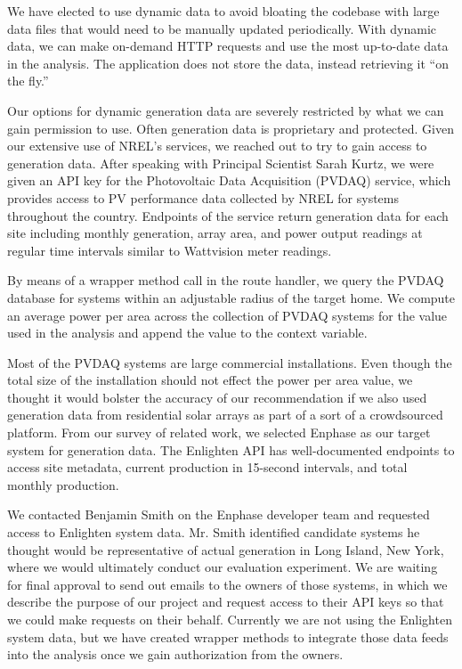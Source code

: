 \documentclass[pageno]{jpaper}
\begin{document}
We have elected to use dynamic data to avoid bloating the codebase with large data files that would need to be manually updated periodically. With dynamic data, we can make on-demand HTTP requests and use the most up-to-date data in the analysis. The application does not store the data, instead retrieving it ``on the fly.''

Our options for dynamic generation data are severely restricted by what we can gain permission to use. Often generation data is proprietary and protected. Given our extensive use of NREL's services, we reached out to try to gain access to generation data. After speaking with Principal Scientist Sarah Kurtz, we were given an API key for the Photovoltaic Data Acquisition (PVDAQ) service, which provides access to PV performance data collected by NREL for systems throughout the country. Endpoints of the service return generation data for each site including monthly generation, array area, and power output readings at regular time intervals similar to Wattvision meter readings.

By means of a wrapper method call in the route handler, we query the PVDAQ database for systems within an adjustable radius of the target home. We compute an average power per area across the collection of PVDAQ systems for the value used in the analysis and append the value to the context variable. 

Most of the PVDAQ systems are large commercial installations. Even though the total size of the installation should not effect the power per area value, we thought it would bolster the accuracy of our recommendation if we also used generation data from residential solar arrays as part of a sort of a crowdsourced platform. From our survey of related work, we selected Enphase as our target system for generation data. The Enlighten API has well-documented endpoints to access site metadata, current production in 15-second intervals, and total monthly production.

We contacted Benjamin Smith on the Enphase developer team and requested access to Enlighten system data. Mr. Smith identified candidate systems he thought would be representative of actual generation in Long Island, New York, where we would ultimately conduct our evaluation experiment. We are waiting for final approval to send out emails to the owners of those systems, in which we describe the purpose of our project and request access to their API keys so that we could make requests on their behalf. Currently we are not using the Enlighten system data, but we have created wrapper methods to integrate those data feeds into the analysis once we gain authorization from the owners. 
\end{document}

